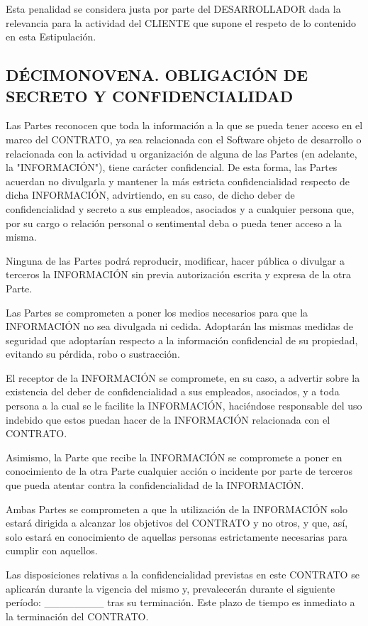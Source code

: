 \documentclass[a4paper,11pt]{report}
\begin{document}
	Esta penalidad se considera justa por parte del DESARROLLADOR dada la
	relevancia para la actividad del CLIENTE que supone el respeto de lo
	contenido en esta Estipulación.

	\subsection*{DÉCIMONOVENA. OBLIGACIÓN DE SECRETO Y CONFIDENCIALIDAD}

	Las Partes reconocen que toda la información a la que se pueda tener
	acceso en el marco del CONTRATO, ya sea relacionada con el Software
	objeto de desarrollo o relacionada con la actividad u organización de
	alguna de las Partes (en adelante, la "{INFORMACIÓN}"), tiene carácter
	confidencial. De esta forma, las Partes acuerdan no divulgarla y
	mantener la más estricta confidencialidad respecto de dicha INFORMACIÓN,
	advirtiendo, en su caso, de dicho deber de confidencialidad y secreto a
	sus empleados, asociados y a cualquier persona que, por su cargo o
	relación personal o sentimental deba o pueda tener acceso a la misma.

	Ninguna de las Partes podrá reproducir, modificar, hacer pública o
	divulgar a terceros la INFORMACIÓN sin previa autorización escrita y
	expresa de la otra Parte.

	Las Partes se comprometen a poner los medios necesarios para que la
	INFORMACIÓN no sea divulgada ni cedida. Adoptarán las mismas medidas de
	seguridad que adoptarían respecto a la información confidencial de su
	propiedad, evitando su pérdida, robo o sustracción.

	El receptor de la INFORMACIÓN se compromete, en su caso, a advertir
	sobre la existencia del deber de confidencialidad a sus empleados,
	asociados, y a toda persona a la cual se le facilite la INFORMACIÓN,
	haciéndose responsable del uso indebido que estos puedan hacer de la
	INFORMACIÓN relacionada con el CONTRATO.

	Asimismo, la Parte que recibe la INFORMACIÓN se compromete a poner en
	conocimiento de la otra Parte cualquier acción o incidente por parte de
	terceros que pueda atentar contra la confidencialidad de la INFORMACIÓN.

	Ambas Partes se comprometen a que la utilización de la INFORMACIÓN solo
	estará dirigida a alcanzar los objetivos del CONTRATO y no otros, y que,
	así, solo estará en conocimiento de aquellas personas estrictamente
	necesarias para cumplir con aquellos.

	Las disposiciones relativas a la confidencialidad previstas en este
	CONTRATO se aplicarán durante la vigencia del mismo y, prevalecerán
	durante el siguiente período: \_\_\_\_\_\_\_\_ tras su terminación.
	Este plazo de tiempo es inmediato a la terminación del CONTRATO.
\end{document}

